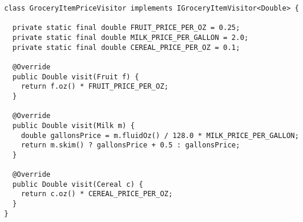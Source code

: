 \begin{cl}[]{}
\begin{lstlisting}[language=MyJava]
class GroceryItemPriceVisitor implements IGroceryItemVisitor<Double> {

  private static final double FRUIT_PRICE_PER_OZ = 0.25;
  private static final double MILK_PRICE_PER_GALLON = 2.0;
  private static final double CEREAL_PRICE_PER_OZ = 0.1;

  @Override
  public Double visit(Fruit f) {
    return f.oz() * FRUIT_PRICE_PER_OZ;
  }

  @Override
  public Double visit(Milk m) {
    double gallonsPrice = m.fluidOz() / 128.0 * MILK_PRICE_PER_GALLON;
    return m.skim() ? gallonsPrice + 0.5 : gallonsPrice;
  }

  @Override
  public Double visit(Cereal c) {
    return c.oz() * CEREAL_PRICE_PER_OZ;
  }
}
\end{lstlisting}
\end{cl}
